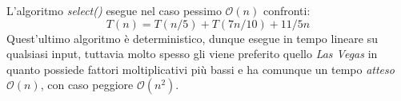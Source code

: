 \documentclass[../cheatSheetAlgoritmi.tex]{subfiles}
\begin{document}
L'algoritmo \emph{select()} esegue nel caso pessimo $\mathcal{O}(n)$ confronti:
\begin{equation*}
    T(n) = T(n/5) + T(7n/10) + 11/5 n
\end{equation*}
Quest'ultimo algoritmo è deterministico, dunque esegue in tempo lineare su qualsiasi input, tuttavia molto spesso gli viene preferito quello \emph{Las Vegas} in quanto possiede fattori moltiplicativi più bassi e ha comunque un tempo \emph{atteso} $\mathcal{O}(n)$, con caso peggiore $\mathcal{O}(n^2)$.
\newpage
\end{document}
